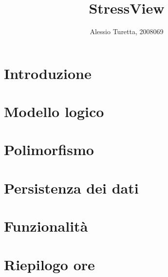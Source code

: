 \documentclass[10pt]{article}
\title{StressView}
\author{Alessio Turetta, 2008069}
\date{}
\begin{document}
\maketitle
\tableofcontents
\newpage

\section{Introduzione}
\section{Modello logico}
\section{Polimorfismo}
\section{Persistenza dei dati}
\section{Funzionalità}
\section{Riepilogo ore}
\end{document}
